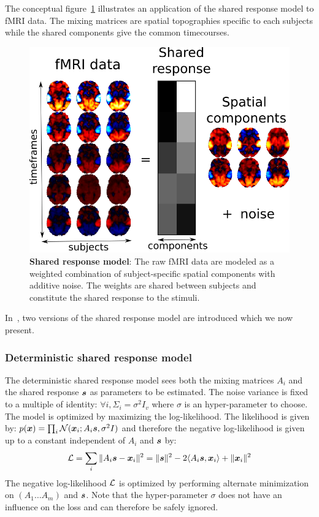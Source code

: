 The conceptual figure~\ref{fig:srm:conceptual_figure} illustrates an 
application of the shared response model to fMRI data. The mixing
matrices are spatial topographies specific to each subjects while the shared
components give the common timecourses.

\begin{figure}
  \centering
  \includegraphics[scale=0.3]{figures/srm/conceptual_figure31.png}
  \caption{\textbf{Shared response model}: The raw fMRI data are modeled as a weighted combination of subject-specific spatial components with additive noise. The weights are shared between subjects and constitute the shared response to the stimuli.}
  \label{fig:srm:conceptual_figure}
\end{figure}

In~\cite{chen2015reduced, anderson2016enabling}, two versions of the shared response model are
introduced which we now present.
\subsubsection{Deterministic shared response model}
\label{sec:deterministicsrm}
The deterministic shared response model sees both the mixing matrices $A_i$ and
the shared response $\boldsymbol{s}$ as parameters to be
estimated. The noise variance is fixed to a multiple of identity: $\forall i,
\Sigma_i=\sigma^2 I_v$ where $\sigma$ is an hyper-parameter to choose.
The model is optimized by maximizing the log-likelihood.
The likelihood is given by: $p(\boldsymbol{x}) = \prod_i \mathcal{N}(\boldsymbol{x}_i; A_i \boldsymbol{s}, \sigma^2 I)$ and
therefore the negative log-likelihood is given up to a constant independent of
$A_i$ and $\boldsymbol{s}$ by:
\begin{align}
  \mathcal{L} = \sum_i \|A_i \boldsymbol{s} - \boldsymbol{x}_i \|^2 = \| \boldsymbol{s} \|^2 -2 \langle A_i \boldsymbol{s}, \boldsymbol{x}_i \rangle + \| \boldsymbol{x}_i \|^2
  \label{eq:detsrmloss}
\end{align}
The negative log-likelihood $\mathcal{L}$ is optimized by performing alternate minimization on $(A_1 \dots A_m)$
and $\boldsymbol{s}$. Note that the hyper-parameter $\sigma$ does not have an influence on
the loss and can therefore be safely ignored.

